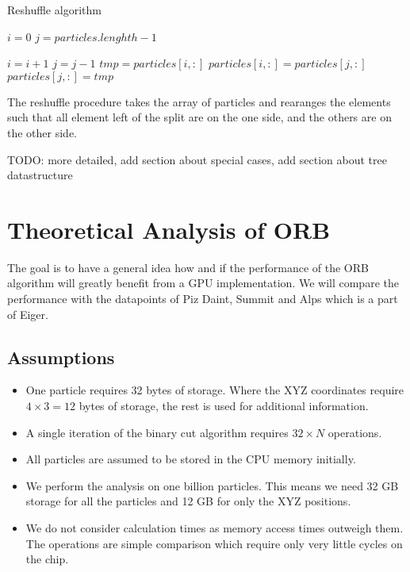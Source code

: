 \documentclass[]{article}
\begin{document}
\begin{algorithm}[H]
	\caption{Reshuffle algorithm}\label{euclid}
	\begin{algorithmic}[1]
		\State $i = 0$
		\State $j = particles.lenghth - 1$
		
			\State $i = i + 1$
			\State $j = j - 1$
			\Else
			\State $tmp = particles[i,:]$
			\State $particles[i,:] = particles[j,:]$
			\State $particles[j,:] = tmp$
			\EndIf
		\EndWhile\label{euclidendwhile}
		
		\EndProcedure
	\end{algorithmic}
\end{algorithm}

The reshuffle procedure takes the array of particles and rearanges the elements such that all element left of the split are on the one side, and the others are on the other side. 

TODO: more detailed, add section about special cases, add section about tree datastructure
\section{Theoretical Analysis of ORB}

The goal is to have a general idea how and if the performance of the ORB algorithm will greatly benefit from a GPU implementation. We will compare the performance with the datapoints of Piz Daint, Summit and Alps which is a part of Eiger. 

\subsection{Assumptions} 
\begin{itemize}
	\item 
	One particle requires 32 bytes of storage. Where the XYZ coordinates require $4\times3 = 12$ bytes of storage, the rest is used for additional information.
	
	\item
	A single iteration of the binary cut algorithm requires $32 \times N$ operations.
	
	\item 
	All particles are assumed to be stored in the CPU memory initially.
	
	\item
	We perform the analysis on one billion particles. This means we need 32 GB storage for all the particles and 12 GB for only the XYZ positions.
	
	\item
	We do not consider calculation times as memory access times  outweigh them. The operations are simple comparison  which require only very little cycles on the chip. 
\end{itemize}
\end{document}
